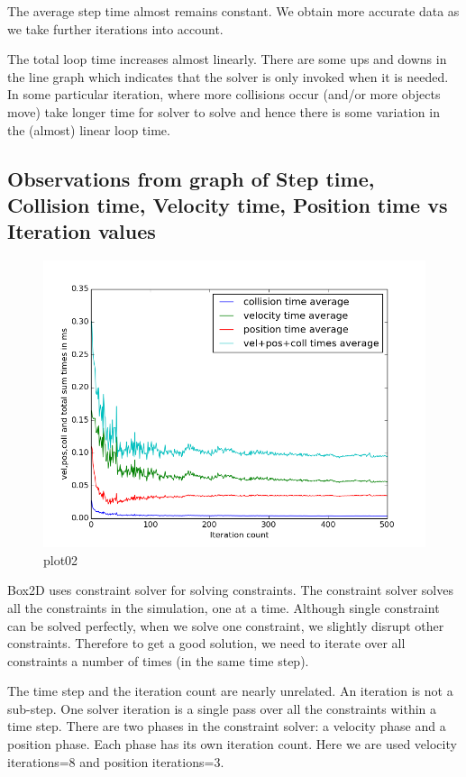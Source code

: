 \documentclass[pdftex,12pt,a4paper]{article}
\begin{document}
\par{The average step time almost remains constant. We obtain more accurate data as we take further iterations into account.} 

\par{The total loop time increases almost linearly. There are some ups and downs in the line graph which indicates that the solver is only invoked when it is needed. In some particular iteration, where more collisions occur (and/or more objects move) take longer time for solver to solve and hence there is some variation in the (almost) linear loop time.}

\subsection{Observations from graph of Step time, Collision time, Velocity time, Position time vs Iteration values}
\begin{figure}[h!]
\centering
\includegraphics[scale=.60]{../images/plot02.png}
\caption{plot02}
\end{figure}

\par{Box2D uses constraint solver for solving constraints. The constraint solver solves all the constraints in the simulation, one at a time. Although single constraint can be solved perfectly, when we solve one constraint, we slightly disrupt other constraints. Therefore to get a good solution, we need to iterate over all constraints a number of times (in the same time step).}

\par{The time step and the iteration count are nearly unrelated. An iteration is not a sub-step. One solver iteration is a single pass over all the constraints within a time step.
There are two phases in the constraint solver: a velocity phase and a position phase. Each phase has its own iteration count. Here we are used velocity iterations=8 and position iterations=3.}
\end{document}
